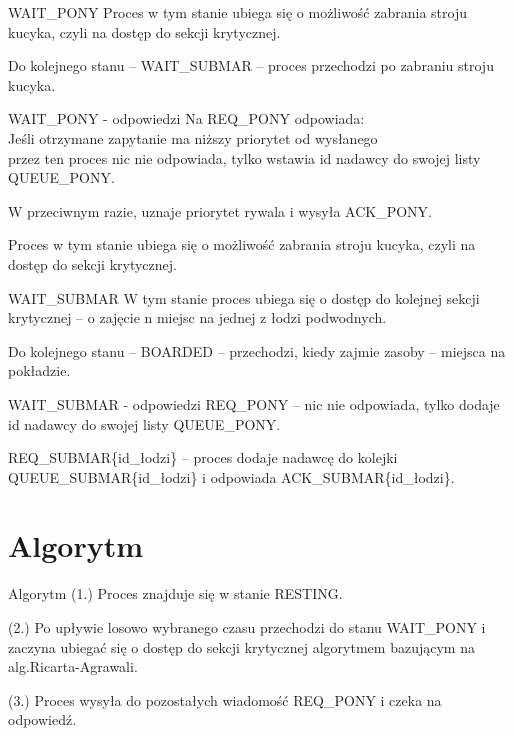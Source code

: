 \documentclass{beamer}
\newcommand\tab[1][1cm]{\hspace*{#1}}
\begin{document}
\begin{frame}{WAIT\_PONY}
    \internallinenumbers
    \resetlinenumber[1]
    Proces w tym stanie ubiega się o  możliwość zabrania stroju kucyka, czyli na dostęp do sekcji krytycznej.

    \vspace{1cm}
    Do kolejnego stanu – WAIT\_SUBMAR – proces przechodzi po zabraniu stroju kucyka.    
\end{frame}

\begin{frame}{WAIT\_PONY - odpowiedzi}
    \internallinenumbers
    \resetlinenumber[1]
    Na REQ\_PONY odpowiada: \\
        \tab[0.5cm] Jeśli otrzymane zapytanie ma niższy priorytet od wysłanego \\
        \tab[0.5cm] przez ten proces nic nie odpowiada, tylko wstawia id nadawcy 
        \tab[0.5cm] do swojej listy QUEUE\_PONY.
        
        \vspace{0.3cm}
        \tab[0.5cm] W przeciwnym razie, uznaje priorytet rywala i wysyła ACK\_PONY.

    \vspace{0.3cm}
    Proces w tym stanie ubiega się o możliwość zabrania stroju kucyka, czyli na dostęp do sekcji krytycznej.
\end{frame}

\begin{frame}{WAIT\_SUBMAR}
    \internallinenumbers
    \resetlinenumber[1]
    W tym stanie proces ubiega się o dostęp do kolejnej sekcji krytycznej – o zajęcie n miejsc na jednej z łodzi podwodnych.

    \vspace{1cm}
    Do kolejnego stanu – BOARDED – przechodzi, kiedy zajmie zasoby – miejsca na pokładzie.
\end{frame}

\begin{frame}{WAIT\_SUBMAR - odpowiedzi}
    \internallinenumbers
    \resetlinenumber[1]
    REQ\_PONY – nic nie odpowiada, tylko dodaje id nadawcy do swojej listy QUEUE\_PONY.

    \vspace{1cm}
    REQ\_SUBMAR\{id\_łodzi\} – proces dodaje nadawcę do kolejki QUEUE\_SUBMAR\{id\_łodzi\} i odpowiada ACK\_SUBMAR\{id\_łodzi\}. 
\end{frame}

\section{Algorytm}
\begin{frame}{Algorytm}
    \internallinenumbers
    (1.) Proces znajduje się w stanie RESTING.

    \vspace{0.5cm}
    (2.) Po upływie losowo wybranego czasu przechodzi do stanu WAIT\_PONY i zaczyna ubiegać się o dostęp do sekcji krytycznej algorytmem bazującym na alg.Ricarta-Agrawali.

    \vspace{0.5cm}
    (3.) Proces wysyła do pozostałych wiadomość REQ\_PONY i czeka na odpowiedź.
\end{frame}
\end{document}
